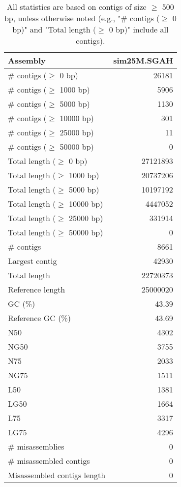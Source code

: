 \documentclass[12pt,a4paper]{article}
\begin{document}
\begin{table}[ht]
\begin{center}
\caption{All statistics are based on contigs of size $\geq$ 500 bp, unless otherwise noted (e.g., "\# contigs ($\geq$ 0 bp)" and "Total length ($\geq$ 0 bp)" include all contigs).}
\begin{tabular}{|l*{1}{|r}|}
\hline
Assembly & sim25M.SGAH \\ \hline
\# contigs ($\geq$ 0 bp) & 26181 \\ \hline
\# contigs ($\geq$ 1000 bp) & 5906 \\ \hline
\# contigs ($\geq$ 5000 bp) & 1130 \\ \hline
\# contigs ($\geq$ 10000 bp) & 301 \\ \hline
\# contigs ($\geq$ 25000 bp) & 11 \\ \hline
\# contigs ($\geq$ 50000 bp) & 0 \\ \hline
Total length ($\geq$ 0 bp) & 27121893 \\ \hline
Total length ($\geq$ 1000 bp) & 20737206 \\ \hline
Total length ($\geq$ 5000 bp) & 10197192 \\ \hline
Total length ($\geq$ 10000 bp) & 4447052 \\ \hline
Total length ($\geq$ 25000 bp) & 331914 \\ \hline
Total length ($\geq$ 50000 bp) & 0 \\ \hline
\# contigs & 8661 \\ \hline
Largest contig & 42930 \\ \hline
Total length & 22720373 \\ \hline
Reference length & 25000020 \\ \hline
GC (\%) & 43.39 \\ \hline
Reference GC (\%) & 43.69 \\ \hline
N50 & 4302 \\ \hline
NG50 & 3755 \\ \hline
N75 & 2033 \\ \hline
NG75 & 1511 \\ \hline
L50 & 1381 \\ \hline
LG50 & 1664 \\ \hline
L75 & 3317 \\ \hline
LG75 & 4296 \\ \hline
\# misassemblies & 0 \\ \hline
\# misassembled contigs & 0 \\ \hline
Misassembled contigs length & 0 \\ \hline

\end{tabular}
\end{center}
\end{table}
\end{document}
